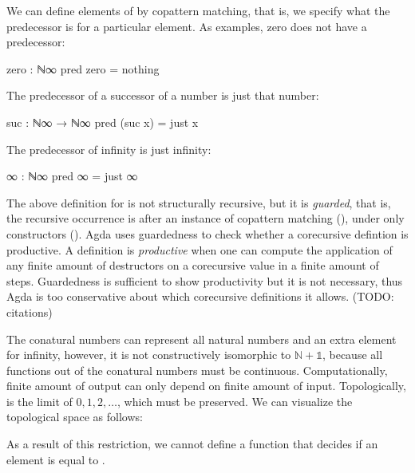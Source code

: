 We can define elements of  by copattern matching, that is, we
specify what the predecessor is for a particular element. As examples, zero does
not have a predecessor:
\begin{code}
zero : ℕ∞
pred zero = nothing
\end{code}
The predecessor of a successor of a number is just that number:
\begin{code}
suc : ℕ∞ → ℕ∞
pred (suc x) = just x
\end{code}
The predecessor of infinity is just infinity:
\begin{code}
∞ : ℕ∞
pred ∞ = just ∞
\end{code}
The above definition for  is not structurally recursive, but it
is \emph{guarded}, that is, the recursive occurrence is after an instance of
copattern matching (), under only constructors
(). Agda uses guardedness to check whether a
corecursive defintion is productive. A definition is \emph{productive} when one
can compute the application of any finite amount of destructors on a corecursive
value in a finite amount of steps. Guardedness is sufficient to show
productivity but it is not necessary, thus Agda is too conservative about which
corecursive definitions it allows. (TODO: citations)

The conatural numbers can represent all natural numbers and an extra element for
infinity, however, it is not constructively isomorphic to $\mathbb{N} +
\mathbb{1}$, because all functions out of the conatural numbers must be
continuous. Computationally, finite amount of output can only depend on finite
amount of input. Topologically,  is the limit of $0, 1, 2,
\dots$, which must be preserved. We can visualize the topological space as
follows:
\begin{center}
\end{center}
As a result of this restriction, we cannot define a function that decides if an
element is equal to .

